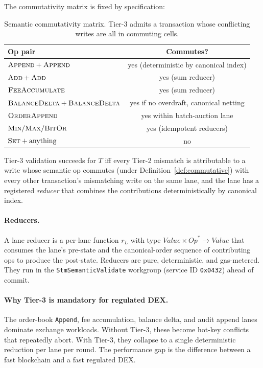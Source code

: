 The commutativity matrix is fixed by specification:

\begin{table}[ht]
\centering
\begin{tabular}{@{}lc@{}}
\toprule
\textbf{Op pair} & \textbf{Commutes?} \\
\midrule
$\textsc{Append} + \textsc{Append}$  & yes (deterministic by canonical index) \\
$\textsc{Add}    + \textsc{Add}$      & yes (sum reducer) \\
$\textsc{FeeAccumulate}$              & yes (sum reducer) \\
$\textsc{BalanceDelta} + \textsc{BalanceDelta}$ & yes if no overdraft, canonical netting \\
$\textsc{OrderAppend}$                & yes within batch-auction lane \\
$\textsc{Min}/\textsc{Max}/\textsc{BitOr}$ & yes (idempotent reducers) \\
$\textsc{Set} + \text{anything}$      & no \\
\bottomrule
\end{tabular}
\caption{Semantic commutativity matrix. Tier-3 admits a transaction
whose conflicting writes are all in commuting cells.}
\label{tab:commutativity}
\end{table}

\begin{definition}
\label{def:tier3}
Tier-3 validation succeeds for $T$ iff every Tier-2 mismatch is
attributable to a write whose semantic op commutes (under
Definition~\ref{def:commutative}) with every other transaction's
mismatching write on the same lane, and the lane has a registered
\emph{reducer} that combines the contributions deterministically by
canonical index.
\end{definition}

\paragraph{Reducers.}
A lane reducer is a per-lane function $r_L$ with type
$\mathit{Value} \times \mathit{Op}^* \to \mathit{Value}$ that consumes
the lane's pre-state and the canonical-order sequence of contributing
ops to produce the post-state. Reducers are pure, deterministic, and
gas-metered. They run in the
\texttt{StmSemanticValidate} workgroup (service ID \texttt{0x0432})
ahead of commit.

\paragraph{Why Tier-3 is mandatory for regulated DEX.}
The order-book \texttt{Append}, fee accumulation, balance
delta, and audit append lanes dominate exchange workloads.
Without Tier-3, these become hot-key conflicts that repeatedly
abort. With Tier-3, they collapse to a single deterministic reduction
per lane per round. The performance gap is the difference between a
fast blockchain and a fast regulated DEX.

